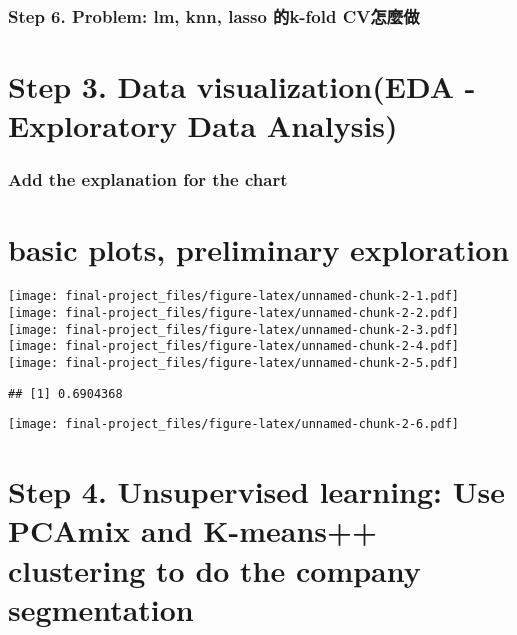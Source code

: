 \documentclass[
]{article}
\begin{document}
\hypertarget{step-6.-problem-lm-knn-lasso-ux7684k-fold-cvux600eux9ebcux505a}{%
\subsubsection{Step 6. Problem: lm, knn, lasso 的k-fold
CV怎麼做}\label{step-6.-problem-lm-knn-lasso-ux7684k-fold-cvux600eux9ebcux505a}}

\hypertarget{step-3.-data-visualizationeda---exploratory-data-analysis}{%
\section{Step 3. Data visualization(EDA - Exploratory Data
Analysis)}\label{step-3.-data-visualizationeda---exploratory-data-analysis}}

\hypertarget{add-the-explanation-for-the-chart}{%
\subsubsection{Add the explanation for the
chart}\label{add-the-explanation-for-the-chart}}

\hypertarget{basic-plots-preliminary-exploration}{%
\section{basic plots, preliminary
exploration}\label{basic-plots-preliminary-exploration}}

\texttt{[image: final-project\_files/figure-latex/unnamed-chunk-2-1.pdf]}
\texttt{[image: final-project\_files/figure-latex/unnamed-chunk-2-2.pdf]}
\texttt{[image: final-project\_files/figure-latex/unnamed-chunk-2-3.pdf]}
\texttt{[image: final-project\_files/figure-latex/unnamed-chunk-2-4.pdf]}
\texttt{[image: final-project\_files/figure-latex/unnamed-chunk-2-5.pdf]}

\begin{verbatim}
## [1] 0.6904368
\end{verbatim}

\texttt{[image: final-project\_files/figure-latex/unnamed-chunk-2-6.pdf]}

\hypertarget{step-4.-unsupervised-learning-use-pcamix-and-k-means-clustering-to-do-the-company-segmentation}{%
\section{Step 4. Unsupervised learning: Use PCAmix and K-means++
clustering to do the company
segmentation}\label{step-4.-unsupervised-learning-use-pcamix-and-k-means-clustering-to-do-the-company-segmentation}}
\end{document}
